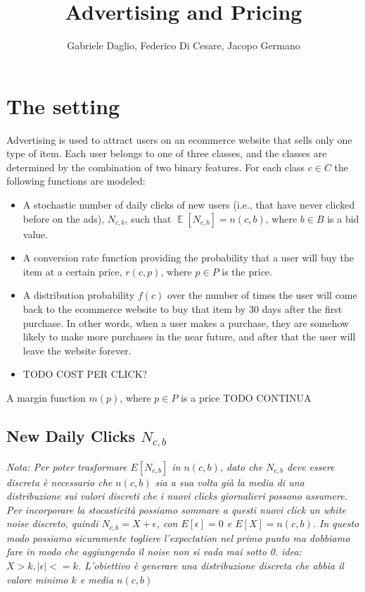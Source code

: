 \documentclass[11pt]{article} %
\title{Advertising and Pricing}
\author{Gabriele Daglio, Federico Di Cesare, Jacopo Germano}
\DeclareMathOperator{\EX}{\mathbb{E}}
\begin{document}
\maketitle

\section{The setting}

Advertising is used to attract users on an ecommerce website that sells only one type of item. Each user belongs to one of three classes, and the classes are determined by the combination of two binary features. For each class $c \in C$ the following functions are modeled:
\begin{itemize}
\item A stochastic number of daily clicks of new users (i.e., that have never clicked before on the ads), $N_{c,b}$, such that $\EX[N_{c,b}]=n(c,b)$, where $b \in B$ is a bid value. 
\item A conversion rate function providing the probability that a user will buy the item at a certain price,  $r(c,p)$, where $p \in P$ is the price.
\item A distribution probability $f(c)$ over the number of times the user will come back to the ecommerce website to buy that item by 30 days after the first purchase. In other words, when a user makes a purchase, they are somehow likely to make more purchases in the near future, and after that the user will leave the website forever. 
\item TODO COST PER CLICK?
\end{itemize}

A margin function $m(p)$, where $p \in P$ is a price TODO CONTINUA


\subsection{New Daily Clicks $N_{c,b}$}
\textit{Nota: Per poter trasformare $E[N_{c,b}]$ in $n(c,b)$, dato che $N_{c,b}$ deve essere discreta è necessario che $n(c,b)$ sia a sua volta già la media di una distribuzione sui valori discreti che i nuovi clicks giornalieri possono assumere. Per incorporare la stocasticità possiamo sommare a questi nuovi click un white noise discreto, quindi $N_{c,b}=X+\epsilon$, con $E[\epsilon]=0$ e  $E[X] = n(c,b)$. In questo modo possiamo sicuramente togliere l'expectation nel primo punto ma dobbiamo fare in modo che aggiungendo il noise non si vada mai sotto 0. idea: $X>k,|\epsilon| <=k$. L'obiettivo è generare una distribuzione discreta che abbia il valore minimo $k$ e media $n(c,b)$}
\newline
\newline
\end{document}
